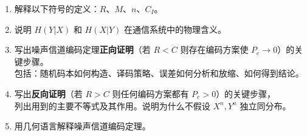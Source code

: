 \documentclass[12pt,a4paper]{ctexart}
\begin{document}
\begin{enumerate}[label=(\arabic*), nosep]
  \item 解释以下符号的定义：$R$、$M$、$n$、$C_I$。

  \item 说明 $H(Y|X)$ 和 $H(X|Y)$ 在通信系统中的物理含义。

  \item 写出噪声信道编码定理\textbf{正向证明}（若 $R < C$ 则存在编码方案使 $P_e \to 0$）的关键步骤。\\
  包括：随机码本如何构造、译码策略、误差如何分析和放缩、如何得到结论。

  \item 写出\textbf{反向证明}（若 $R > C$ 则任何编码方案都有 $P_e > 0$）的关键步骤，\\
  列出用到的主要不等式及其作用。说明为什么不假设 $X^n, Y^n$ 独立同分布。

  \item 用几何语言解释噪声信道编码定理。
\end{enumerate}
\end{document}
